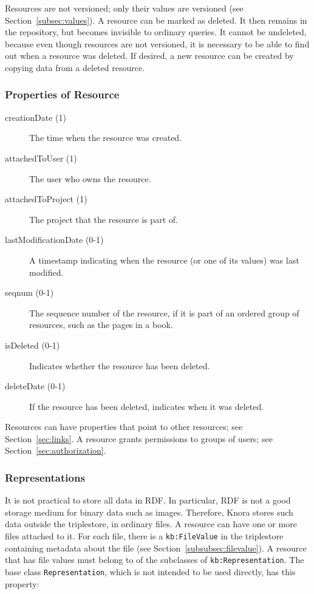 \documentclass[12pt, a4paper]{article}
\begin{document}
Resources are not versioned; only their values are versioned (see Section~\ref{subsec:values}). A resource can be marked as deleted. It then remains in the repository, but becomes invisible to ordinary queries. It cannot be undeleted, because even though resources are not versioned, it is necessary to be able to find out when a resource was deleted. If desired, a new resource can be created by copying data from a deleted resource.

\subsubsection{Properties of Resource}

\begin{description}
  \item[creationDate (1)] The time when the resource was created.
  \item[attachedToUser (1)] The user who owns the resource.
  \item[attachedToProject (1)] The project that the resource is part of.
  \item[lastModificationDate (0-1)] A timestamp indicating when the resource (or one of its values) was last modified.
  \item[seqnum (0-1)] The sequence number of the resource, if it is part of an ordered group of resources, such as the pages in a book. 
  \item[isDeleted (0-1)] Indicates whether the resource has been deleted.
  \item[deleteDate (0-1)] If the resource has been deleted, indicates when it was deleted.
\end{description}

Resources can have properties that point to other resources; see Section~\ref{sec:links}. A resource grants permissions to groups of users; see Section~\ref{sec:authorization}.

\subsubsection{Representations}

\label{subsubsec:representations}

It is not practical to store all data in RDF. In particular, RDF is not a good storage medium for binary data such as images. Therefore, Knora stores such data outside the triplestore, in ordinary files. A resource can have one or more files attached to it. For each file, there is a \texttt{kb:FileValue} in the triplestore containing metadata about the file (see Section~\ref{subsubsec:filevalue}). A resource that has file values must belong to of the subclasses of \texttt{kb:Representation}. The base class \texttt{Representation}, which is not intended to be used directly, has this property:
\end{document}
